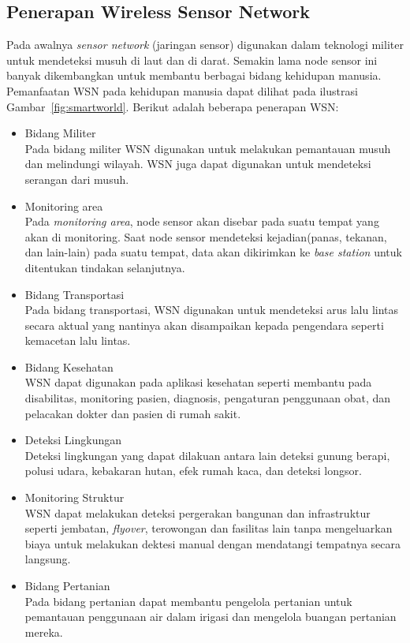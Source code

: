 \subsection{Penerapan Wireless Sensor Network}
Pada awalnya \textit{sensor network} (jaringan sensor) digunakan dalam teknologi militer untuk mendeteksi musuh di laut dan di darat. Semakin lama node sensor ini banyak dikembangkan untuk membantu berbagai bidang kehidupan manusia. Pemanfaatan WSN pada kehidupan manusia dapat dilihat pada ilustrasi Gambar~\ref{fig:smartworld}. Berikut adalah beberapa penerapan WSN:
\begin{itemize}
\item Bidang Militer\\
Pada bidang militer WSN digunakan untuk melakukan pemantauan musuh dan melindungi wilayah. WSN juga dapat digunakan untuk mendeteksi serangan dari musuh.

\item Monitoring area\\
Pada \textit{monitoring area}, node sensor akan disebar pada suatu tempat yang akan di monitoring. Saat node sensor mendeteksi kejadian(panas, tekanan, dan lain-lain) pada suatu tempat, data akan dikirimkan ke \textit{base station} untuk ditentukan tindakan selanjutnya.

\item Bidang Transportasi\\
Pada bidang transportasi, WSN digunakan untuk mendeteksi arus lalu lintas secara aktual yang nantinya akan disampaikan kepada pengendara seperti kemacetan lalu lintas. 

\item Bidang Kesehatan\\
WSN dapat digunakan pada aplikasi kesehatan seperti membantu pada disabilitas, monitoring pasien, diagnosis, pengaturan penggunaan obat, dan pelacakan dokter dan pasien di rumah sakit.

\item Deteksi Lingkungan\\
Deteksi lingkungan yang dapat dilakuan antara lain deteksi gunung berapi, polusi udara, kebakaran hutan, efek rumah kaca, dan deteksi longsor.

\item Monitoring Struktur\\
WSN dapat melakukan deteksi pergerakan bangunan dan infrastruktur seperti jembatan, \textit{flyover}, terowongan dan fasilitas lain tanpa mengeluarkan biaya untuk melakukan dektesi manual dengan mendatangi tempatnya secara langsung.

\item Bidang Pertanian\\
Pada bidang pertanian dapat membantu pengelola pertanian untuk pemantauan penggunaan air dalam irigasi dan mengelola buangan pertanian mereka.
\end{itemize}

